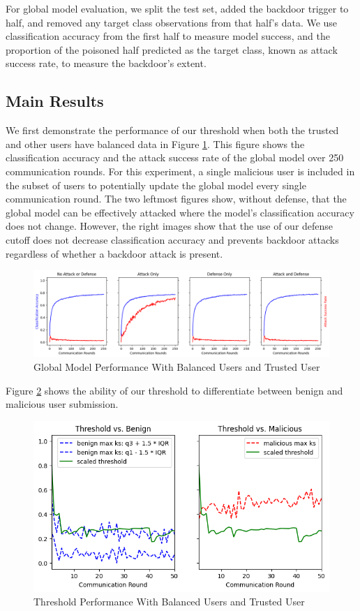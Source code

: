 \documentclass{article} %
\begin{document}
For global model evaluation, we split the test set, added the backdoor trigger to half, and removed any target class observations from that half's data. We use classification accuracy from the first half to measure model success, and the proportion of the poisoned half predicted as the target class, known as attack success rate, to measure the backdoor's extent.


%
\subsection{Main Results}
We first demonstrate the performance of our threshold when both the trusted and other users have balanced data in Figure \ref{fig:accuracy_balanced}. This figure shows the classification accuracy and the attack success rate of the global model over 250 communication rounds. For this experiment, a single malicious user is included in the subset of users to potentially update the global model every single communication round. The two leftmost figures show, without defense, that the global model can be effectively attacked where the model's classification accuracy does not change. However, the right images show that the use of our defense cutoff does not decrease classification accuracy and prevents backdoor attacks regardless of whether a backdoor attack is present. 

\begin{figure}[h!]
    \centering
    \includegraphics[width=\textwidth]{centralized/alpha10000--alpha_val10000/visuals/accuracy.png}
    \caption{Global Model Performance With Balanced Users and Trusted User}
    \label{fig:accuracy_balanced}
\end{figure}

Figure \ref{fig:threshold_balanced} shows the ability of our threshold to differentiate between benign and malicious user submission. 

\begin{figure}[h!]
    \centering
    \includegraphics[width=.75\textwidth]{centralized/alpha10000--alpha_val10000/visuals/threshold--d_rounds50.png}
    \caption{Threshold Performance With Balanced Users and Trusted User}
    \label{fig:threshold_balanced}
\end{figure}
\end{document}
